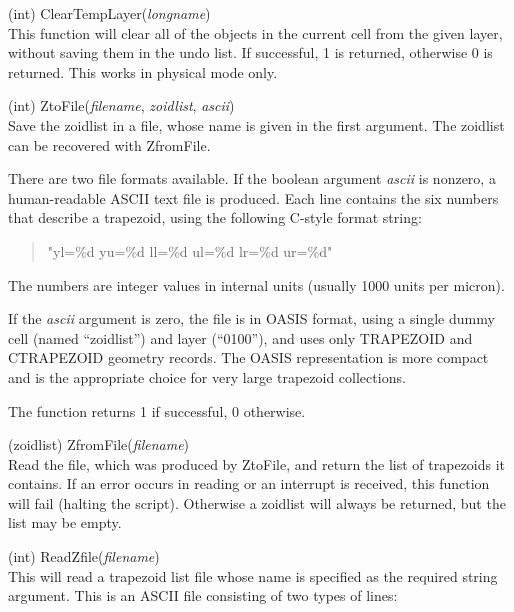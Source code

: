 \begin{description}
\item{(int) \vt ClearTempLayer({\it longname\/})}\\
This function will clear all of the objects in the current cell from
the given layer, without saving them in the undo list.  If successful,
1 is returned, otherwise 0 is returned.  This works in physical mode
only.

\item{(int) \vt ZtoFile({\it filename\/}, {\it zoidlist\/}, {\it ascii\/})}\\
Save the zoidlist in a file, whose name is given in the first
argument.  The zoidlist can be recovered with {\vt ZfromFile}.

There are two file formats available.  If the boolean argument {\it
ascii} is nonzero, a human-readable ASCII text file is produced.  Each
line contains the six numbers that describe a trapezoid, using the
following C-style format string:
\begin{quote} \vt
"yl=\%d yu=\%d ll=\%d ul=\%d lr=\%d ur=\%d"
\end{quote}
The numbers are integer values in internal units (usually 1000 units
per micron).

If the {\it ascii} argument is zero, the file is in OASIS format,
using a single dummy cell (named ``zoidlist'') and layer (``0100''),
and uses only TRAPEZOID and CTRAPEZOID geometry records.  The OASIS
representation is more compact and is the appropriate choice for very
large trapezoid collections.

The function returns 1 if successful, 0 otherwise.

\item{(zoidlist) \vt ZfromFile({\it filename\/})}\\
Read the file, which was produced by {\vt ZtoFile}, and return the
list of trapezoids it contains.  If an error occurs in reading or an
interrupt is received, this function will fail (halting the script). 
Otherwise a zoidlist will always be returned, but the list may be
empty.

\item{(int) \vt ReadZfile({\it filename\/})}\\
This will read a trapezoid list file whose name is specified as the
required string argument.  This is an ASCII file consisting of two
types of lines:


\end{description}
